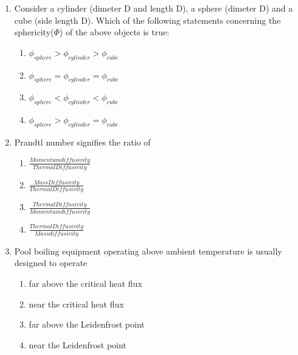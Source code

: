 \documentclass[journal,12pt,onecolumn]{IEEEtran}
\theoremstyle{remark}
\begin{document}
\begin{enumerate}
    \item Consider a cylinder (dimeter D and length D), a sphere (dimeter D) and a cube (side length D). Which of the following statements concerning the sphericity($\Phi$) of the above objects is true:
    
     \hfill{}
\begin{multicols}{2}
    \begin{enumerate}
        \item $\phi_{sphere} > \phi_{cylinder} > \phi_{cube}$
        \item $\phi_{sphere} = \phi_{cylinder} = \phi_{cube}$
        \item $\phi_{sphere} < \phi_{cylinder} < \phi_{cube}$
        \item $\phi_{sphere} > \phi_{cylinder} = \phi_{cube} $
    \end{enumerate}
\end{multicols}

    \item Prandtl number signifies the ratio of
    
     \hfill{}
\begin{multicols}{2}
    \begin{enumerate}
    \item $\frac{Momentum diffusivity}{Thermal Diffusivity}$
    \item $\frac{Mass Diffusivity}{Thermal Diffusivity}$
    \item $\frac{Thermal Diffusivity}{Momentum diffusivity}$
    \item $\frac{Thermal Diffusivity}{Mass diffusivity}$
    \end{enumerate}
\end{multicols}

    \item Pool boiling equipment operating above ambient temperature is usually designed to operate
    
     \hfill{}
\begin{multicols}{2}
    \begin{enumerate}
        \item far above the critical heat flux
        \item near the critical heat flux
        \item far above the Leidenfrost point
        \item near the Leidenfrost point
    \end{enumerate}
\end{multicols}
\newpage


\end{enumerate}
\end{document}
